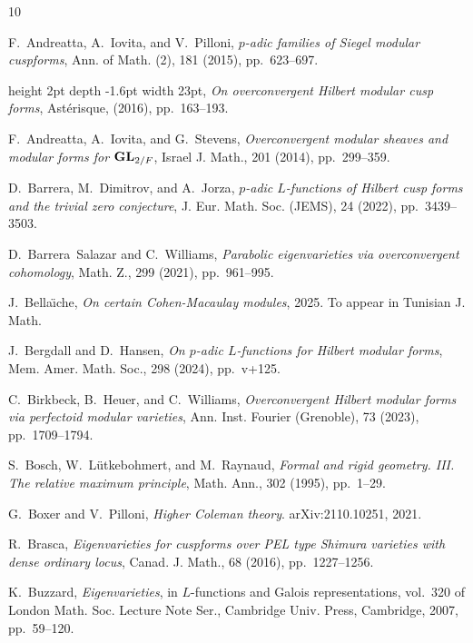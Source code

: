 \documentclass[11pt]{amsart}
\theoremstyle{definition} %
\theoremstyle{plain} %
\theoremstyle{remark} %
\begin{document}

\begin{thebibliography}{10}

{\sc F.~Andreatta, A.~Iovita, and V.~Pilloni}, {\em {$p$}-adic families of
  {S}iegel modular cuspforms}, Ann. of Math. (2), 181 (2015), pp.~623--697.

\leavevmode\vrule height 2pt depth -1.6pt width 23pt, {\em On overconvergent
  {H}ilbert modular cusp forms}, Ast\'{e}risque,  (2016), pp.~163--193.

{\sc F.~Andreatta, A.~Iovita, and G.~Stevens}, {\em Overconvergent modular
  sheaves and modular forms for {${\bf GL}_{2/F}$}}, Israel J. Math., 201
  (2014), pp.~299--359.

{\sc D.~Barrera, M.~Dimitrov, and A.~Jorza}, {\em {$p$}-adic {$L$}-functions of
  {H}ilbert cusp forms and the trivial zero conjecture}, J. Eur. Math. Soc.
  (JEMS), 24 (2022), pp.~3439--3503.

{\sc D.~Barrera~Salazar and C.~Williams}, {\em Parabolic eigenvarieties via
  overconvergent cohomology}, Math. Z., 299 (2021), pp.~961--995.

{\sc J.~Bella\"{\i}che}, {\em On certain Cohen-Macaulay modules}, 2025. To appear in Tunisian J. Math.

{\sc J.~Bergdall and D.~Hansen}, {\em On {$p$}-adic {$L$}-functions for
  {H}ilbert modular forms}, Mem. Amer. Math. Soc., 298 (2024), pp.~v+125.

{\sc C.~Birkbeck, B.~Heuer, and C.~Williams}, {\em Overconvergent {H}ilbert
  modular forms via perfectoid modular varieties}, Ann. Inst. Fourier
  (Grenoble), 73 (2023), pp.~1709--1794.

{\sc S.~Bosch, W.~L\"{u}tkebohmert, and M.~Raynaud}, {\em Formal and rigid
  geometry. {III}. {T}he relative maximum principle}, Math. Ann., 302 (1995),
  pp.~1--29.

{\sc G.~Boxer and V.~Pilloni}, {\em Higher {C}oleman theory}.
\newblock arXiv:2110.10251, 2021.

{\sc R.~Brasca}, {\em Eigenvarieties for cuspforms over {PEL} type {S}himura
  varieties with dense ordinary locus}, Canad. J. Math., 68 (2016),
  pp.~1227--1256.

{\sc K.~Buzzard}, {\em Eigenvarieties}, in {$L$}-functions and {G}alois
  representations, vol.~320 of London Math. Soc. Lecture Note Ser., Cambridge
  Univ. Press, Cambridge, 2007, pp.~59--120.


\end{thebibliography}
\end{document}
